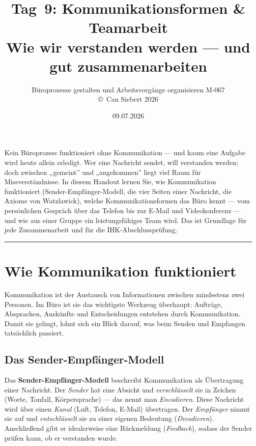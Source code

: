 \documentclass[11pt, a4paper]{article}
\title{\vspace*{-1.5cm}\Huge\bfseries\color{bfwPrimaryDark}Tag~9: Kommunikationsformen \& Teamarbeit\\[0.4em]
  \large\color{bfwInkSoft}\textnormal{Wie wir verstanden werden --- und gut zusammenarbeiten}}
\author{\textsf{Büroprozesse gestalten und Arbeitsvorgänge organisieren \textperiodcentered{} M-067}\\
\textsf{\small\copyright\ Can Siebert\,\textperiodcentered\,2026}}
\date{09.07.2026}
\begin{document}
\maketitle
\thispagestyle{empty}

\vspace{1em}
\begin{merksatz}[title={\bfseries Worum geht es heute?}]
Kein Büroprozess funktioniert ohne Kommunikation --- und kaum eine Aufgabe wird heute
allein erledigt. Wer eine Nachricht sendet, will verstanden werden; doch zwischen
„gemeint” und „angekommen” liegt viel Raum für Missverständnisse. In diesem Handout
lernen Sie, wie Kommunikation funktioniert (Sender-Empfänger-Modell, die vier Seiten
einer Nachricht, die Axiome von Watzlawick), welche Kommunikations\-formen das Büro
kennt --- vom persönlichen Gespräch über das Telefon bis zur E-Mail und Video\-konferenz ---
und wie aus einer Gruppe ein leistungsfähiges Team wird. Das ist Grundlage für jede
Zusammenarbeit und für die IHK-Abschlussprüfung.
\end{merksatz}

\tableofcontents
\vspace{1em}
\hrule
\vspace{1em}

\section{Wie Kommunikation funktioniert}

Kommunikation ist der Austausch von Informationen zwischen mindestens zwei Personen.
Im Büro ist sie das wichtigste Werkzeug überhaupt: Aufträge, Absprachen, Auskünfte und
Entscheidungen entstehen durch Kommunikation. Damit sie gelingt, lohnt sich ein Blick
darauf, was beim Senden und Empfangen tatsächlich passiert.

\subsection{Das Sender-Empfänger-Modell}

Das \textbf{Sender-Empfänger-Modell} beschreibt Kommunikation als Übertragung einer
Nachricht. Der \emph{Sender} hat eine Absicht und \emph{verschlüsselt} sie in Zeichen
(Worte, Tonfall, Körpersprache) --- das nennt man \emph{Encodieren}. Diese Nachricht
wird über einen \emph{Kanal} (Luft, Telefon, E-Mail) übertragen. Der \emph{Empfänger}
nimmt sie auf und \emph{entschlüsselt} sie zu einer eigenen Bedeutung
(\emph{Decodieren}). Anschließend gibt er idealerweise eine Rückmeldung
(\emph{Feedback}), sodass der Sender prüfen kann, ob er verstanden wurde.
\end{document}
